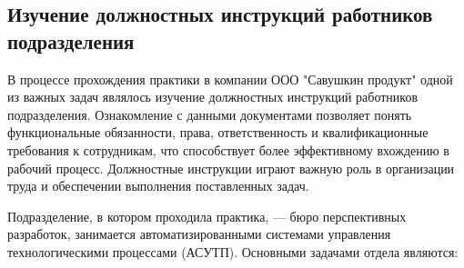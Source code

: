 \subtitlespace

\subsection*{ 
  \gostTitleFont
   Изучение должностных инструкций работников подразделения
} 

\subtitlespace

{\gostFont

  \par \redline В процессе прохождения практики в компании ООО "Савушкин продукт" одной из важных задач являлось изучение должностных инструкций работников подразделения. Ознакомление с данными документами позволяет понять функциональные обязанности, права, ответственность и квалификационные требования к сотрудникам, что способствует более эффективному вхождению в рабочий процесс. Должностные инструкции играют важную роль в организации труда и обеспечении выполнения поставленных задач. 

  \par \redline Подразделение, в котором проходила практика, — бюро перспективных разработок, занимается автоматизированными системами управления технологическими процессами (АСУТП). Основными задачами отдела являются:

}
